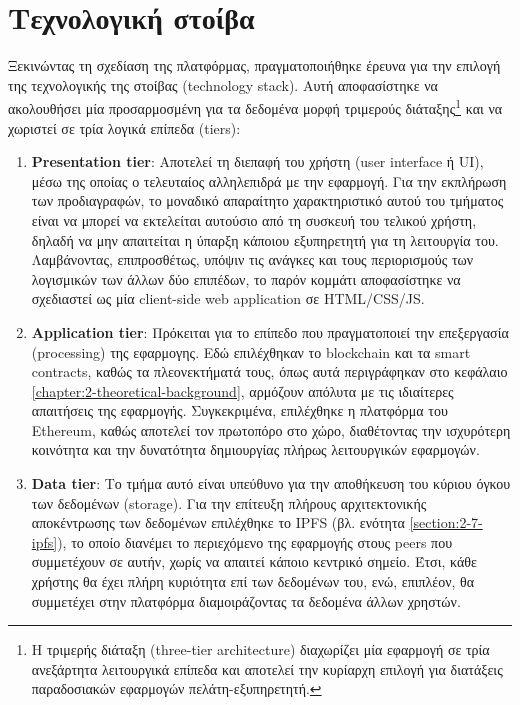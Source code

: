 \section{Τεχνολογική στοίβα} \label{section:3-2-technology-stack}

Ξεκινώντας τη σχεδίαση της πλατφόρμας, πραγματοποιήθηκε έρευνα για την επιλογή της τεχνολογικής της στοίβας (technology stack). Αυτή αποφασίστηκε να ακολουθήσει μία προσαρμοσμένη για τα δεδομένα μορφή τριμερούς διάταξης\footnote{Η τριμερής διάταξη (three-tier architecture) διαχωρίζει μία εφαρμογή σε τρία ανεξάρτητα λειτουργικά επίπεδα και αποτελεί την κυρίαρχη επιλογή για διατάξεις παραδοσιακών εφαρμογών πελάτη-εξυπηρετητή.} και να χωριστεί σε τρία λογικά επίπεδα (tiers):

\begin{enumerate}
    \item \textbf{Presentation tier}: Αποτελεί τη διεπαφή του χρήστη (user interface ή UI), μέσω της οποίας ο τελευταίος αλληλεπιδρά με την εφαρμογή. Για την εκπλήρωση των προδιαγραφών, το μοναδικό απαραίτητο χαρακτηριστικό αυτού του τμήματος είναι να μπορεί να εκτελείται αυτούσιο από τη συσκευή του τελικού χρήστη, δηλαδή να μην απαιτείται η ύπαρξη κάποιου εξυπηρετητή για τη λειτουργία του. Λαμβάνοντας, επιπροσθέτως, υπόψιν τις ανάγκες και τους περιορισμούς των λογισμικών των άλλων δύο επιπέδων, το παρόν κομμάτι αποφασίστηκε να σχεδιαστεί ως μία client-side web application σε HTML/CSS/JS.

    \item \textbf{Application tier}: Πρόκειται για το επίπεδο που πραγματοποιεί την επεξεργασία (\textenglish{processing}) της εφαρμογης. Εδώ επιλέχθηκαν το blockchain και τα smart contracts, καθώς τα πλεονεκτήματά τους, όπως αυτά περιγράφηκαν στο κεφάλαιο \ref{chapter:2-theoretical-background}, αρμόζουν απόλυτα με τις ιδιαίτερες απαιτήσεις της εφαρμογής. Συγκεκριμένα, επιλέχθηκε η πλατφόρμα του Ethereum, καθώς αποτελεί τον πρωτοπόρο στο χώρο, διαθέτοντας την ισχυρότερη κοινότητα και την δυνατότητα δημιουργίας πλήρως λειτουργικών εφαρμογών.

    \item \textbf{Data tier}: Το τμήμα αυτό είναι υπεύθυνο για την αποθήκευση του κύριου όγκου των δεδομένων (storage). Για την επίτευξη πλήρους αρχιτεκτονικής αποκέντρωσης των δεδομένων επιλέχθηκε το IPFS (βλ. ενότητα \ref{section:2-7-ipfs}), το οποίο διανέμει το περιεχόμενο της εφαρμογής στους peers που συμμετέχουν σε αυτήν, χωρίς να απαιτεί κάποιο κεντρικό σημείο. Έτσι, κάθε χρήστης θα έχει πλήρη κυριότητα επί των δεδομένων του, ενώ, επιπλέον, θα συμμετέχει στην πλατφόρμα διαμοιράζοντας τα δεδομένα άλλων χρηστών.
\end{enumerate}


